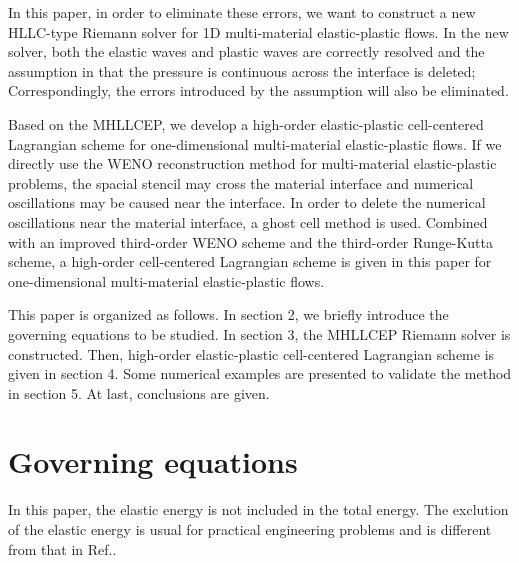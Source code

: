 \documentclass[review]{elsarticle}
\begin{document}
In this paper, in order to eliminate these errors,
we want to construct a new HLLC-type Riemann solver \cite{toro2013riemann} for 1D multi-material elastic-plastic flows. In the new solver, both the elastic waves and plastic waves are correctly resolved and the assumption in \cite{cheng2016harten} that the pressure is continuous across the interface is deleted; Correspondingly, the errors introduced by the assumption will also be eliminated.

Based on the MHLLCEP, we develop a high-order elastic-plastic cell-centered Lagrangian scheme for one-dimensional multi-material elastic-plastic flows. If we directly use the WENO reconstruction method \cite{jiang1996efficient,huang2012eulerian,dumbser2013high} for multi-material elastic-plastic problems,
the spacial stencil may cross the material interface
 and numerical oscillations may be caused near the interface. In order to delete the numerical oscillations near the material interface, a ghost cell method is used.
   Combined with an improved third-order WENO scheme\cite{liu2018novel} and the third-order Runge-Kutta scheme, a high-order cell-centered Lagrangian scheme is given in this paper for one-dimensional multi-material elastic-plastic flows.

This paper is organized as follows. In section 2, we briefly introduce the governing equations to be studied. In section 3, the MHLLCEP Riemann solver is constructed.  Then, high-order elastic-plastic cell-centered Lagrangian scheme is given in section 4. Some numerical examples are presented to validate the method  in section 5. At last, conclusions are given.
\section{Governing equations}
In this paper, the elastic energy is not included in the total energy. The exclution of the elastic energy is usual for practical engineering problems \cite{maire2013nominally} and is different from that in Ref.\cite{gavrilyuk2008modelling}.

\end{document}
